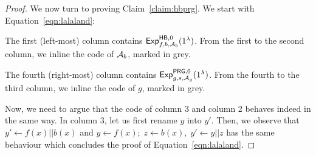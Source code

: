 \documentclass[a4paper,table,dvipsnames]{article}
\theoremstyle{definition}
\begin{document}
\begin{proof}
We now turn to proving Claim~\ref{claim:hbprg}. We start with Equation~\ref{eqn:lalaland}:

\begin{center}
\begin{pchstack}
		    \pchspace
	  		\pchspace
				\pchspace
\end{pchstack}
\end{center}
The first (left-most) column contains ${\mathsf{Exp}}_{f,b,\mathcal{A}_b}^{\mathsf{HB},0}(1^\lambda)$.
From the first to the second column, we inline the code of $\mathcal{A}_b$, marked in grey.

The fourth (right-most) column contains ${\mathsf{Exp}}_{g,s,\mathcal{A}_g}^{\mathsf{PRG},0}(1^\lambda)$.
From the fourth to the third column, we inline the code of $g$, marked in grey.

Now, we need to argue that the code of column 3 and column 2 behaves indeed in the same way.
In column 3, let us first rename $y$ into $y'$. Then, we observe that $y'\gets f(x)||b(x)$ and $y\gets f(x);\;z\gets b(x),\; y'\gets y||z$
has the same behaviour which concludes the proof of Equation~\ref{eqn:lalaland}.


\end{proof}
\end{document}
